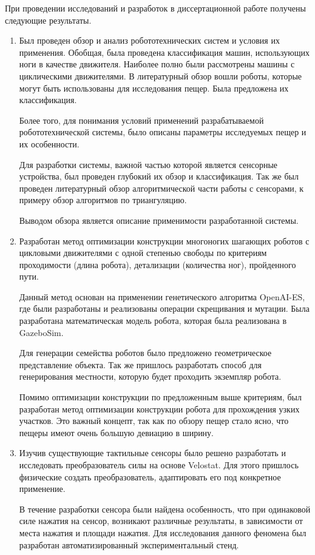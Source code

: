 При  проведении  исследований  и  разработок  в  диссертационной  работе  получены 
следующие результаты.
\begin{enumerate}
  \item Был проведен обзор и анализ робототехнических систем и условия их применения. Обобщая, была проведена классификация машин, использующих ноги в качестве движителя. Наиболее полно были рассмотрены машины с циклическими движителями. В литературный обзор вошли роботы, которые могут быть использованы для исследования пещер. Была предложена их классификация.

  Более того, для понимания условий применений разрабатываемой робототехнической системы, было описаны параметры исследуемых пещер и их особенности.

  Для разработки системы, важной частью которой является сенсорные устройства, был проведен глубокий их обзор и классификация. Так же был проведен литературный обзор алгоритмической части работы с сенсорами, к примеру обзор алгоритмов по триангуляцию.

  Выводом обзора является описание применимости разработанной системы.
  \item Разработан метод оптимизации конструкции многоногих шагающих роботов с цикловыми движителями с одной степенью свободы по критериям проходимости (длина робота), детализации (количества ног), пройденного пути.

  Данный метод основан на применении генетического алгоритма OpenAI-ES, где были разработаны и реализованы операции скрещивания и мутации. Была разработана математическая модель робота, которая была реализована в GazeboSim. 
  
  Для генерации семейства роботов было предложено геометрическое представление объекта. Так же пришлось разработать способ для генерирования местности, которую будет проходить экземпляр робота.

  Помимо оптимизации конструкции по предложенным выше критериям, был разработан метод оптимизации конструкции робота для прохождения узких участков. Это важный концепт, так как по обзору пещер стало ясно, что пещеры имеют очень большую девиацию в ширину.
  \item Изучив существующие тактильные сенсоры было решено разработать и исследовать преобразователь силы на основе Velostat. Для этого пришлось физические создать преобразователь, адаптировать его под конкретное применение.

  В течение разработки сенсора были найдена особенность, что при одинаковой силе нажатия на сенсор, возникают различные результаты, в зависимости от места нажатия и площади нажатия. Для исследования данного феномена был разработан автоматизированный экспериментальный стенд. 
  

\end{enumerate}
